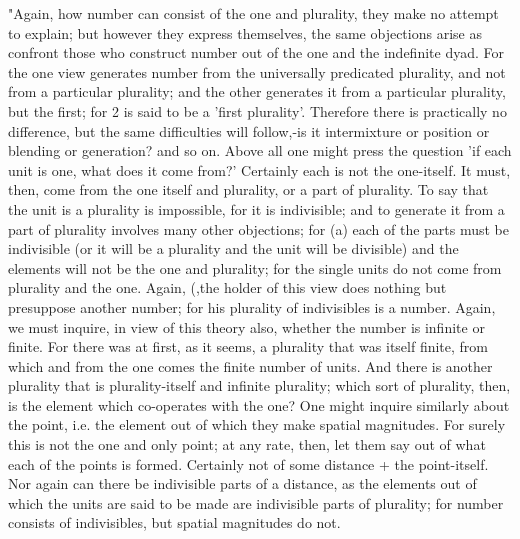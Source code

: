 "Again, how number can consist of the one and plurality, they make
no attempt to explain; but however they express themselves, the same
objections arise as confront those who construct number out of the
one and the indefinite dyad. For the one view generates number from
the universally predicated plurality, and not from a particular plurality;
and the other generates it from a particular plurality, but the first;
for 2 is said to be a 'first plurality'. Therefore there is practically
no difference, but the same difficulties will follow,-is it intermixture
or position or blending or generation? and so on. Above all one might
press the question 'if each unit is one, what does it come from?'
Certainly each is not the one-itself. It must, then, come from the
one itself and plurality, or a part of plurality. To say that the
unit is a plurality is impossible, for it is indivisible; and to generate
it from a part of plurality involves many other objections; for (a)
each of the parts must be indivisible (or it will be a plurality and
the unit will be divisible) and the elements will not be the one and
plurality; for the single units do not come from plurality and the
one. Again, (,the holder of this view does nothing but presuppose
another number; for his plurality of indivisibles is a number. Again,
we must inquire, in view of this theory also, whether the number is
infinite or finite. For there was at first, as it seems, a plurality
that was itself finite, from which and from the one comes the finite
number of units. And there is another plurality that is plurality-itself
and infinite plurality; which sort of plurality, then, is the element
which co-operates with the one? One might inquire similarly about
the point, i.e. the element out of which they make spatial magnitudes.
For surely this is not the one and only point; at any rate, then,
let them say out of what each of the points is formed. Certainly not
of some distance + the point-itself. Nor again can there be indivisible
parts of a distance, as the elements out of which the units are said
to be made are indivisible parts of plurality; for number consists
of indivisibles, but spatial magnitudes do not. 

